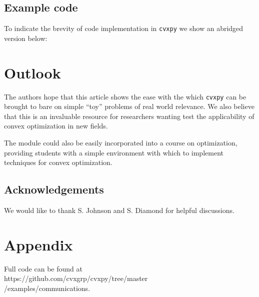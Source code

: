 \documentclass[twocolumn,secnumarabic,amssymb, nobibnotes, aps, prl,superscriptaddress]{revtex4-1}
\begin{document}
\subsection{Example code}
To indicate the brevity of code implementation in \texttt{cvxpy} we show an abridged version below: 

\section{Outlook}
The authors hope that this article shows the ease with the which \texttt{cvxpy} can be brought to bare on simple ``toy'' problems of real world relevance. We also believe that this is an invaluable resource for researchers wanting test the applicability of convex optimization in new fields. 

The module could also be easily incorporated into a course on optimization, providing students with a simple environment with which to implement techniques for convex optimization.



\subsection*{Acknowledgements}
We would like to thank S. Johnson and S. Diamond for helpful discussions.

\section*{Appendix}
Full code can be found at\\ https://github.com/cvxgrp/cvxpy/tree/master\\/examples/communications.

\vspace{1cm}
 


\end{document}
